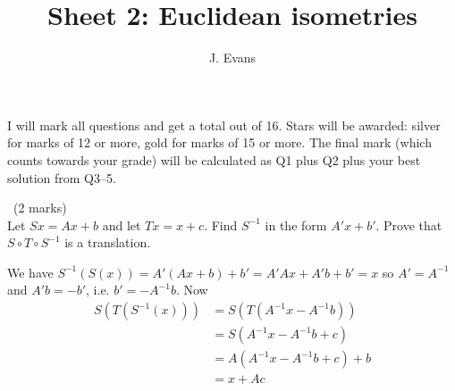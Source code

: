 \documentclass[12pt]{article}
\title{Sheet 2: Euclidean isometries}
\author{J. Evans}
\date{}
\begin{document}
\maketitle

\bigskip

I will mark all questions and get a total out of 16. Stars will be awarded: silver for marks of 12 or more, gold for marks of 15 or more. The final mark (which counts towards your grade) will be calculated as Q1 plus Q2 plus your best solution from Q3--5.

\vspace{1cm}

\begin{question}\ (2 marks)\\
Let $Sx=Ax+b$ and let $Tx=x+c$. Find $S^{-1}$ in the form $A'x+b'$. Prove that $S\circ T\circ S^{-1}$ is a translation.
\end{question}

\begin{answer}
  We have $S^{-1}(S(x))=A'(Ax+b)+b'=A'Ax+A'b+b'=x$ so $A'=A^{-1}$ and $A'b=-b'$, i.e. $b'=-A^{-1}b$. Now
  \begin{align*}
    S(T(S^{-1}(x)))&=S(T(A^{-1}x-A^{-1}b))\\
    &=S(A^{-1}x-A^{-1}b+c)\\
    &=A(A^{-1}x-A^{-1}b+c)+b\\
    &=x+Ac
  \end{align*}
\end{answer}
\newpage

\vspace{1cm}
\end{document}

